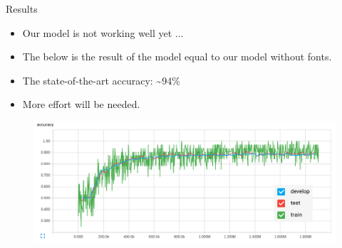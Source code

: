 \documentclass[aspectratio=43,unicode,10pt]{beamer}
\begin{document}
\begin{frame}{Results}
  \begin{itemize}
    \item Our model is not working well yet ...
    \item The below is the result of the model equal
          to our model without fonts.
    \item The state-of-the-art accuracy: \sim 94\%
    \item More effort will be needed.
  \end{itemize}
  \begin{figure}
    \includegraphics[width=\linewidth]{fig/cwsd_learning.png}
  \end{figure}
\end{frame}
\end{document}
